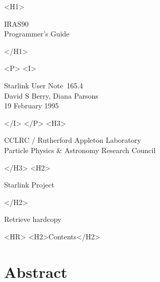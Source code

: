 \documentclass[twoside,11pt]{article}
\newcommand{\stardoccategory}  {Starlink User Note}
\newcommand{\stardocsource}    {sun\stardocnumber}
\newcommand{\stardocnumber}    {165.4}
\newcommand{\stardocauthors}   {David S Berry, Diana Parsons}
\newcommand{\stardocdate}      {19 February 1995}
\newcommand{\stardoctitle}     {IRAS90\\[2ex]
                               Programmer's Guide}
\newcommand{\htmladdnormallink}[2]{#1}
\newcommand{\htmladdimg}[1]{}
\newcommand{\htmlref}[2]{#1}
\newcommand{\htmladdtonavigation}[1]{}
\newcommand{\xlabel}[1]{}
\begin{document}
\begin{htmlonly}
   \xlabel{}
   \begin{rawhtml} <H1> \end{rawhtml}
      \stardoctitle
   \begin{rawhtml} </H1> \end{rawhtml}


   \begin{rawhtml} <P> <I> \end{rawhtml}
   \stardoccategory\ \stardocnumber \\
   \stardocauthors \\
   \stardocdate
   \begin{rawhtml} </I> </P> <H3> \end{rawhtml}
      \htmladdnormallink{CCLRC}{http://www.cclrc.ac.uk} /
      \htmladdnormallink{Rutherford Appleton Laboratory}
                        {http://www.cclrc.ac.uk/ral} \\
      \htmladdnormallink{Particle Physics \& Astronomy Research Council}
                        {http://www.pparc.ac.uk} \\
   \begin{rawhtml} </H3> <H2> \end{rawhtml}
      \htmladdnormallink{Starlink Project}{http://star-www.rl.ac.uk/}
   \begin{rawhtml} </H2> \end{rawhtml}
   \htmladdnormallink{\htmladdimg{source.gif} Retrieve hardcopy}
      {http://star-www.rl.ac.uk/cgi-bin/hcserver?\stardocsource}\\

  \label{stardoccontents}
  \begin{rawhtml} 
    <HR>
    <H2>Contents</H2>
  \end{rawhtml}
  \htmladdtonavigation{\htmlref{\htmladdimg{contents_motif.gif}}
        {stardoccontents}}

  \section{\xlabel{abstract}Abstract}
\end{htmlonly}
\end{document}
